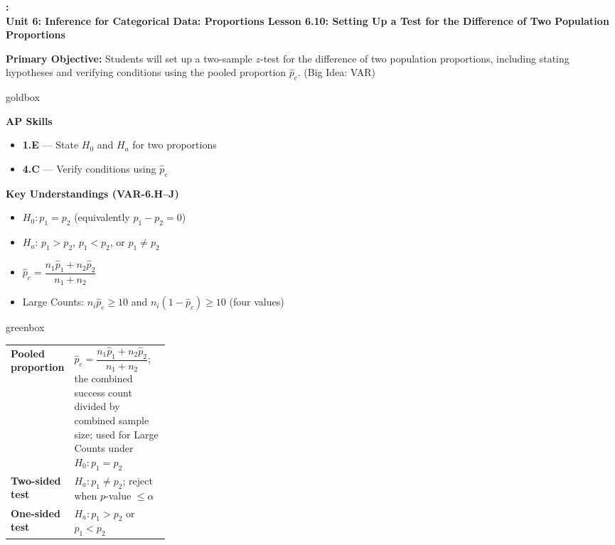 \documentclass[10pt]{article}
\newcommand{\UnitNumberName}{Unit 6: Inference for Categorical Data: Proportions \quad}
\newcommand{\LessonNumberName}{Lesson 6.10: Setting Up a Test for the Difference of Two Population Proportions}
\begin{document}
\begin{center}
    {\Large\bfseries \CourseName: \SchoolYear \\
    {\small\bfseries \UnitNumberName \LessonNumberName}}
\end{center}

\begin{tcolorbox}[colback=sky, colframe=navy, boxrule=0.9pt, arc=2mm,
    left=2mm, right=2mm, top=1.5mm, bottom=1.5mm]
    \textbf{Primary Objective:} Students will set up a two-sample $z$-test for the
    difference of two population proportions, including stating hypotheses and verifying conditions
    using the pooled proportion $\hat p_c$. (Big Idea: VAR)
\end{tcolorbox}

\renewcommand{\arraystretch}{1.6}
\begin{skillbox}{goldbox}
    \begin{minipage}[t]{0.48\linewidth}\vspace{0pt}
        \textbf{AP Skills}
        \begin{itemize}[leftmargin=1.2em]
            \item \textbf{1.E} --- State $H_0$ and $H_a$ for two proportions
            \item \textbf{4.C} --- Verify conditions using $\hat p_c$
        \end{itemize}
    \end{minipage}\hfill
    \begin{minipage}[t]{0.48\linewidth}\vspace{0pt}
        \textbf{Key Understandings (VAR-6.H--J)}
        \begin{itemize}[leftmargin=1.2em]
            \item $H_0: p_1 = p_2$ (equivalently $p_1 - p_2 = 0$)
            \item $H_a$: $p_1>p_2$, $p_1<p_2$, or $p_1\ne p_2$
            \item $\hat p_c = \dfrac{n_1\hat p_1 + n_2\hat p_2}{n_1+n_2}$
            \item Large Counts: $n_i\hat p_c \ge 10$ and $n_i(1-\hat p_c)\ge 10$ (four values)
        \end{itemize}
    \end{minipage}
\end{skillbox}

\begin{skillbox}{greenbox}
    \renewcommand{\arraystretch}{1.4}
    \begin{tabularx}{\linewidth}{@{} p{0.26\linewidth} X @{}}
        \textbf{Pooled proportion} & $\hat p_c = \dfrac{n_1\hat p_1 + n_2\hat p_2}{n_1+n_2}$; the combined success count divided by combined sample size; used for Large Counts under $H_0: p_1=p_2$ \\
        \textbf{Two-sided test} & $H_a: p_1 \ne p_2$; reject when $p$-value $\le\alpha$ \\
        \textbf{One-sided test} & $H_a: p_1>p_2$ or $p_1<p_2$ \\
    \end{tabularx}
\end{skillbox}
\end{document}
